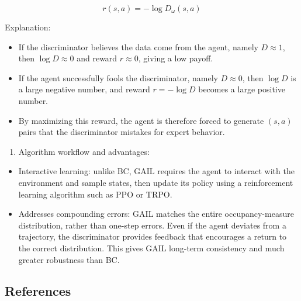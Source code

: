 \[
r(s,a)
=
-
\log D_\omega(s,a)
\]

Explanation:

\begin{itemize}
\tightlist
\item
  If the discriminator believes the data come from the agent, namely \(D\approx 1\), then \(\log D\approx 0\) and reward \(r\approx 0\), giving a low payoff.
\item
  If the agent successfully fools the discriminator, namely \(D\approx 0\), then \(\log D\) is a large negative number, and reward \(r=-\log D\) becomes a large positive number.
\item
  By maximizing this reward, the agent is therefore forced to generate \((s,a)\) pairs that the discriminator mistakes for expert behavior.
\end{itemize}

\begin{enumerate}
\def\labelenumi{\arabic{enumi}.}
\setcounter{enumi}{2}
\tightlist
\item
{}
  Algorithm workflow and advantages:
\end{enumerate}

\begin{itemize}
\tightlist
\item
  Interactive learning: unlike BC, GAIL requires the agent to interact with the environment and sample states, then update its policy using a reinforcement learning algorithm such as PPO or TRPO.
\item
  Addresses compounding errors: GAIL matches the entire occupancy-measure distribution, rather than one-step errors. Even if the agent deviates from a trajectory, the discriminator provides feedback that encourages a return to the correct distribution. This gives GAIL long-term consistency and much greater robustness than BC.
\end{itemize}

\FloatBarrier
{}
\hypertarget{references-62}{%
\subsection{References}\label{references-62}}

